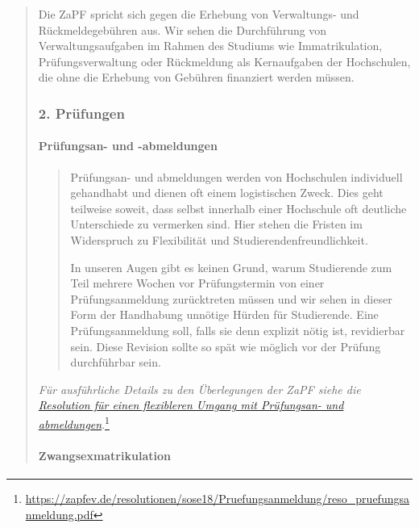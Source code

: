 \documentclass[DIV=14]{scrartcl}
\begin{document}
\begin{quote}
Die ZaPF spricht sich gegen die Erhebung von Verwaltungs- und
Rückmeldegebühren aus. Wir sehen die Durchführung von
Verwaltungsaufgaben im Rahmen des Studiums wie Immatrikulation,
Prüfungsverwaltung oder Rückmeldung als Kernaufgaben der
Hochschulen, die ohne die Erhebung von Gebühren finanziert werden
müssen.


\hypertarget{pruxfcfungen}{%
\subsubsection*{2. Prüfungen}\label{pruxfcfungen}}

\hypertarget{pruxfcfungsan--und--abmeldungen}{%
\paragraph{Prüfungsan- und -abmeldungen}\label{pruxfcfungsan--und--abmeldungen}}

\begin{quote}
Prüfungsan- und abmeldungen werden von Hochschulen individuell
gehandhabt und dienen oft einem logistischen Zweck. Dies geht teilweise soweit, dass selbst innerhalb einer Hochschule oft deutliche Unterschiede zu vermerken sind. Hier stehen die Fristen im Widerspruch zu Flexibilität und Studierendenfreundlichkeit.

In unseren Augen gibt es keinen Grund, warum Studierende zum Teil
mehrere Wochen vor Prüfungstermin von einer Prüfungsanmeldung
zurücktreten müssen und wir sehen in dieser Form der Handhabung unnötige Hürden für Studierende. Eine Prüfungsanmeldung soll, falls sie denn explizit nötig ist, revidierbar sein. Diese Revision sollte so spät wie möglich vor der Prüfung durchführbar sein.
\end{quote}

\emph{Für ausführliche Details zu den Überlegungen der ZaPF siehe die}
\href{https://zapfev.de/resolutionen/sose18/Pruefungsanmeldung/reso_pruefungsanmeldung.pdf}{\emph{Resolution
    für einen flexibleren Umgang mit Prüfungsan- und abmeldungen}}.\footnote{\url{https://zapfev.de/resolutionen/sose18/Pruefungsanmeldung/reso_pruefungsanmeldung.pdf}}

\hypertarget{zwangsexmatrikulation}{%
\paragraph{Zwangsexmatrikulation}\label{zwangsexmatrikulation}}


\end{quote}
\end{document}
